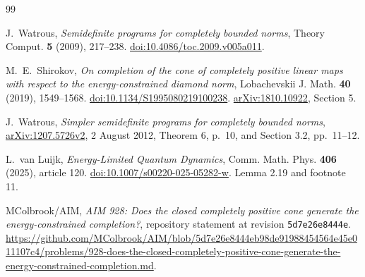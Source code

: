 \documentclass[11pt,a4paper]{article}
\theoremstyle{remark}
\begin{document}
\begin{thebibliography}{99}
\small\raggedright
\setlength{\itemsep}{3pt}

J.~Watrous,
\emph{Semidefinite programs for completely bounded norms},
Theory Comput. \textbf{5} (2009), 217--238.
\href{https://doi.org/10.4086/toc.2009.v005a011}{doi:10.4086/toc.2009.v005a011}.

M.~E.~Shirokov,
\emph{On completion of the cone of completely positive linear maps with
respect to the energy-constrained diamond norm},
Lobachevskii J. Math. \textbf{40} (2019), 1549--1568.
\href{https://doi.org/10.1134/S1995080219100238}{doi:10.1134/S1995080219100238}.
\href{https://arxiv.org/abs/1810.10922}{arXiv:1810.10922}, Section 5.

J.~Watrous,
\emph{Simpler semidefinite programs for completely bounded norms},
\href{https://arxiv.org/abs/1207.5726v2}{arXiv:1207.5726v2},
2 August 2012, Theorem 6, p.~10, and Section 3.2, pp.~11--12.

L.~van Luijk,
\emph{Energy-Limited Quantum Dynamics},
Comm. Math. Phys. \textbf{406} (2025), article 120.
\href{https://doi.org/10.1007/s00220-025-05282-w}{doi:10.1007/s00220-025-05282-w}.
Lemma 2.19 and footnote 11.

MColbrook/AIM, \emph{AIM 928: Does the closed completely positive cone generate the energy-constrained completion?},
repository statement at revision \texttt{5d7e26e8444e}.
\url{https://github.com/MColbrook/AIM/blob/5d7e26e8444eb98de91988454564e45e011107c4/problems/928-does-the-closed-completely-positive-cone-generate-the-energy-constrained-completion.md}.
\end{thebibliography}
\end{document}
